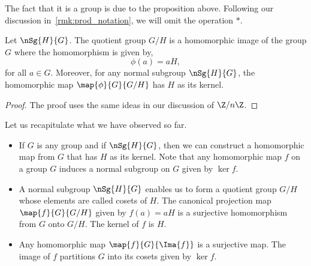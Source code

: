 The fact that it is a group is due to the proposition above. Following our discussion
in~\ref{rmk:prod_notation}, we will omit the operation $\ast$.
\begin{Proposition}
    Let $\nSg{H}{G}$. The quotient group $G/H$ is a 
    homomorphic image of the group $G$ where the homomorphism is given by,
    \[\phi(a) = aH,\]
    for all $a \in G$. Moreover, for any normal subgroup $\nSg{H}{G}$, the homomorphic map 
    $\map{\phi}{G}{G/H}$ has $H$ as its kernel.
\end{Proposition}
\begin{proof}
    The proof uses the same ideas in our discussion of $\Z/n\Z$.
\end{proof}
Let us recapitulate what we have observed so far.
\begin{itemize}
    \item
	If $G$ is any group and if $\nSg{H}{G}$, then we can construct a homomorphic map from $G$ that has $H$ as
	its kernel. Note that any homomorphic map $f$ on a group $G$ induces a normal subgroup on $G$ given by  
	$\ker{f}$.
    \item
	A normal subgroup $\nSg{H}{G}$ enables us to form a quotient group $G/H$ whose elements are called cosets
	of $H$. The canonical projection map $\map{f}{G}{G/H}$ given by $f(a) = aH$ is a surjective
	homomorphism from $G$ onto $G/H$. The kernel of $f$ is $H$.
    \item
	Any homomorphic map $\map{f}{G}{\Ima{f}}$ is a surjective map. The image of $f$ partitions $G$ into 
	its cosets given
	by $\ker{f}$.
\end{itemize}

